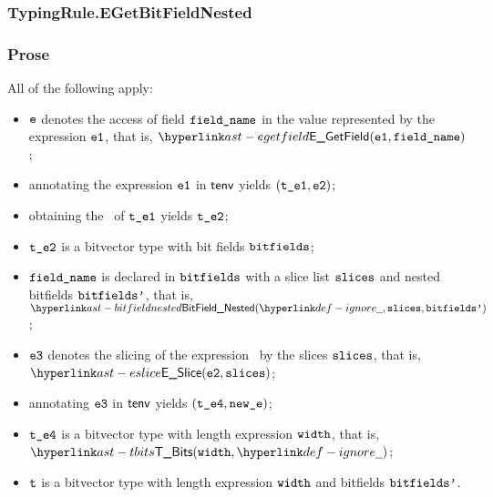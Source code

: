 \subsubsection{TypingRule.EGetBitFieldNested \label{sec:TypingRule.EGetBitFieldNested}}
\subsubsection{Prose}
All of the following apply:
\begin{itemize}
  \item $\texttt{e}$ denotes the access of field $\texttt{field\_name}$ in the value represented by the expression $\texttt{e1}$, that is, $\EGetField(\veone, \fieldname)$;
  \item annotating the expression $\texttt{e1}$ in $\textsf{tenv}$ yields $(\texttt{t\_e1}, \texttt{e2})$\ProseOrTypeError;
  \item obtaining the \underlyingtype\ of $\texttt{t\_e1}$ yields $\texttt{t\_e2}$\ProseOrTypeError;
  \item $\texttt{t\_e2}$ is a bitvector type with bit fields $\texttt{bitfields}$;
  \item $\texttt{field\_name}$ is declared in $\texttt{bitfields}$ with a slice list $\texttt{slices}$ and nested bitfields $\texttt{bitfields'}$, that is,
        $\BitFieldNested(\Ignore, \slices, \bitfieldsp)$;
  \item $\texttt{e3}$ denotes the slicing of the expression \vetwo\ by the slices $\texttt{slices}$, that is, \\ $\ESlice(\vetwo, \slices)$;
  \item annotating $\texttt{e3}$ in $\textsf{tenv}$ yields $(\texttt{t\_e4}, \texttt{new\_e})$\ProseOrTypeError;
  \item $\texttt{t\_e4}$ is a bitvector type with length expression $\texttt{width}$, that is, $\TBits(\width, \Ignore)$;
  \item $\texttt{t}$ is a bitvector type with length expression $\texttt{width}$ and bitfields $\texttt{bitfields'}$.
\end{itemize}
